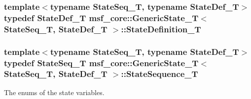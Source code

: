 \hypertarget{structmsf__core_1_1GenericState__T_a9a7d65b0325658ab07b81960a3ed4604}{
\subsubsection[{State\-Definition\-\_\-\-T}]{\setlength{\rightskip}{0pt plus 5cm}template$<$typename State\-Seq\-\_\-\-T, typename State\-Def\-\_\-\-T$>$ typedef State\-Def\-\_\-\-T {\bf msf\-\_\-core\-::\-Generic\-State\-\_\-\-T}$<$ State\-Seq\-\_\-\-T, State\-Def\-\_\-\-T $>$\-::{\bf State\-Definition\-\_\-\-T}}}\label{structmsf__core_1_1GenericState__T_a9a7d65b0325658ab07b81960a3ed4604}
\hypertarget{structmsf__core_1_1GenericState__T_a75fe70f7c7517dbf7d4c91b75b08a1dd}{
\subsubsection[{State\-Sequence\-\_\-\-T}]{\setlength{\rightskip}{0pt plus 5cm}template$<$typename State\-Seq\-\_\-\-T, typename State\-Def\-\_\-\-T$>$ typedef State\-Seq\-\_\-\-T {\bf msf\-\_\-core\-::\-Generic\-State\-\_\-\-T}$<$ State\-Seq\-\_\-\-T, State\-Def\-\_\-\-T $>$\-::{\bf State\-Sequence\-\_\-\-T}}}\label{structmsf__core_1_1GenericState__T_a75fe70f7c7517dbf7d4c91b75b08a1dd}
The enums of the state variables. 

